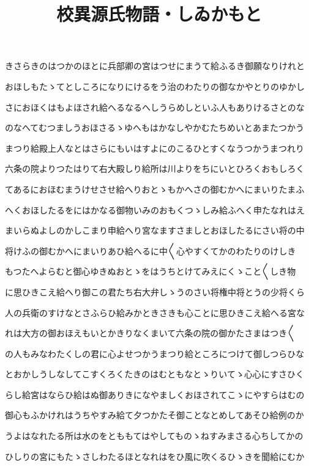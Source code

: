 \documentclass[a4paper,11pt,landscape]{ltjtarticle}
\title{校異源氏物語・しゐかもと}
\date{}
\begin{document}
\maketitle

きさらきのはつかのほとに兵部卿の宮はつせにまうて給ふるき御願なりけれと
\par\medskip
おほしもたゝてとしころになりにけるをう治のわたりの御なかやとりのゆかし
\par\medskip
さにおほくはもよほされ給へるなるへしうらめしといふ人もありけるさとのな
\par\medskip
のなへてむつましうおほさるゝゆへもはかなしやかむたちめいとあまたつかう
\par\medskip
まつり給殿上人なとはさらにもいはすよにのこるひとすくなうつかうまつれり
\par\medskip
六条の院よりつたはりて右大殿しり給所は川よりをちにいとひろくおもしろく
\par\medskip
てあるにおほむまうけせさせ給へりおとゝもかへさの御むかへにまいりたまふ
\par\medskip
へくおほしたるをにはかなる御物いみのおもくつゝしみ給ふへく申たなれはえ
\par\medskip
まいらぬよしのかしこまり申給へり宮なますさましとおほしたるにさい将の中
\par\medskip
将けふの御むかへにまいりあひ給へるに中〱心やすくてかのわたりのけしき
\par\medskip
もつたへよらむと御心ゆきぬおとゝをはうちとけてみえにくゝこと〱しき物
\par\medskip
に思ひきこえ給へり御この君たち右大弁しゝうのさい将権中将とうの少将くら
\par\medskip
人の兵衛のすけなとさふらひ給みかときさきも心ことに思ひきこえ給へる宮な
\par\medskip
れは大方の御おほえもいとかきりなくまいて六条の院の御かたさまはつき〱
\par\medskip
の人もみなわたくしの君に心よせつかうまつり給ところにつけて御しつらひな
\par\medskip
とおかしうしなしてこすくろくたきのはむともなとゝりいてゝ心心にすさひく
\par\medskip
らし給宮はならひ給はぬ御ありきになやましくおほされてこゝにやすらはむの
\par\medskip
御心もふかけれはうちやすみ給て夕つかたそ御ことなとめしてあそひ給例のか
\par\medskip
うよはなれたる所は水のをとももてはやしてものゝねすみまさる心ちしてかの
\par\medskip
ひしりの宮にもたゝさしわたるほとなれはをひ風に吹くるひゝきを聞給にむか
\end{document}
